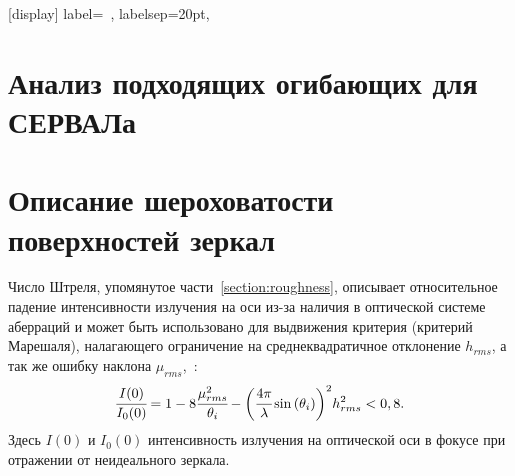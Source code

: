 \appendix
\sectionformat{\chapter}[display]{%
    label=\chaptertitlename\ \thechapter,%
    labelsep=20pt,
}
\renewcommand\thechapter{\Asbuk{chapter}} %
\chapter{Анализ подходящих огибающих для СЕРВАЛа} \label{AppendixA}
\chapter{Описание шероховатости поверхностей зеркал} \label{AppendixB}
Число Штреля, упомянутое части~\ref{section:roughness}, описывает относительное падение интенсивности излучения на оси из-за наличия в оптической системе аберраций и может быть использовано для выдвижения критерия (критерий Марешаля), налагающего ограничение на среднеквадратичное отклонение $h_{rms}$, а так же ошибку наклона $\mu_{rms}$,~\cite{church_specification_1993}:
\begin{align}
	\cfrac{I(0)}{I_0(0)} = 1 - 8\cfrac{\mu^2_{rms}}{\theta_i} - \bigg(\cfrac{4 \pi}{\lambda} \sin{(\theta_i)} \bigg)^2 h^2_{rms} < 0,8.
	\label{eq:Marechal_criterion}
\end{align}
Здесь $I(0)$ и $I_0(0)$ интенсивность излучения на оптической оси в фокусе при отражении от неидеального зеркала. 

